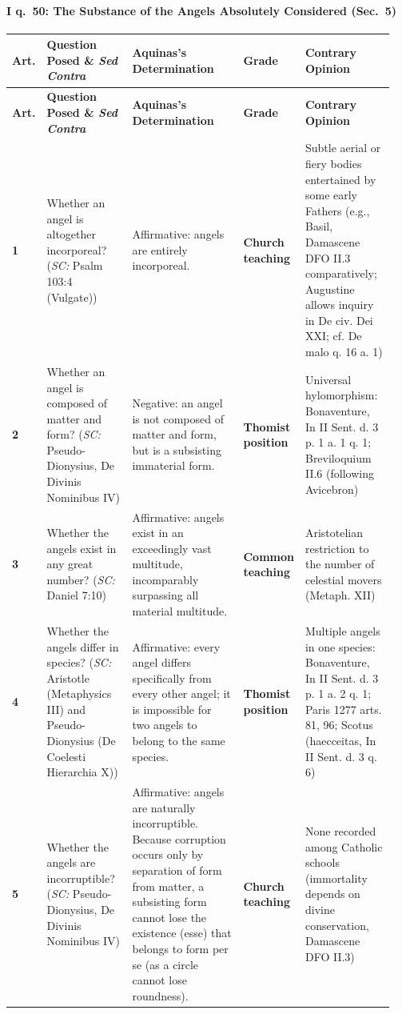 \paragraph{I q.~50: The Substance of the Angels Absolutely Considered (Sec.~5)}
{\scriptsize
\setlength{\tabcolsep}{2.5pt}
\renewcommand{\arraystretch}{1.15}
\begin{longtable}{>{\raggedright\arraybackslash}p{0.05\linewidth}>{\raggedright\arraybackslash}p{0.23\linewidth}>{\raggedright\arraybackslash}p{0.31\linewidth}>{\raggedright\arraybackslash}p{0.12\linewidth}>{\raggedright\arraybackslash}p{0.24\linewidth}}
\toprule
\textbf{Art.} & \textbf{Question Posed \& \emph{Sed Contra}} & \textbf{Aquinas's Determination} & \textbf{Grade} & \textbf{Contrary Opinion} \\
\midrule
\endfirsthead
\toprule
\textbf{Art.} & \textbf{Question Posed \& \emph{Sed Contra}} & \textbf{Aquinas's Determination} & \textbf{Grade} & \textbf{Contrary Opinion} \\
\midrule
\endhead
\bottomrule
\endfoot
\textbf{1} & Whether an angel is altogether incorporeal? (\emph{SC:} Psalm 103:4 (Vulgate)) & Affirmative: angels are entirely incorporeal. & \textbf{Church teaching} & Subtle aerial or fiery bodies entertained by some early Fathers (e.g., Basil, Damascene DFO II.3 comparatively; Augustine allows inquiry in De civ. Dei XXI; cf. De malo q. 16 a. 1) \\
\addlinespace[1.5pt]
\textbf{2} & Whether an angel is composed of matter and form? (\emph{SC:} Pseudo-Dionysius, De Divinis Nominibus IV) & Negative: an angel is not composed of matter and form, but is a subsisting immaterial form. & \textbf{Thomist position} & Universal hylomorphism: Bonaventure, In II Sent. d. 3 p. 1 a. 1 q. 1; Breviloquium II.6 (following Avicebron) \\
\addlinespace[1.5pt]
\textbf{3} & Whether the angels exist in any great number? (\emph{SC:} Daniel 7:10) & Affirmative: angels exist in an exceedingly vast multitude, incomparably surpassing all material multitude. & \textbf{Common teaching} & Aristotelian restriction to the number of celestial movers (Metaph. XII) \\
\addlinespace[1.5pt]
\textbf{4} & Whether the angels differ in species? (\emph{SC:} Aristotle (Metaphysics III) and Pseudo-Dionysius (De Coelesti Hierarchia X)) & Affirmative: every angel differs specifically from every other angel; it is impossible for two angels to belong to the same species. & \textbf{Thomist position} & Multiple angels in one species: Bonaventure, In II Sent. d. 3 p. 1 a. 2 q. 1; Paris 1277 arts. 81, 96; Scotus (haecceitas, In II Sent. d. 3 q. 6) \\
\addlinespace[1.5pt]
\textbf{5} & Whether the angels are incorruptible? (\emph{SC:} Pseudo-Dionysius, De Divinis Nominibus IV) & Affirmative: angels are naturally incorruptible. Because corruption occurs only by separation of form from matter, a subsisting form cannot lose the existence (esse) that belongs to form per se (as a circle cannot lose roundness). & \textbf{Church teaching} & None recorded among Catholic schools (immortality depends on divine conservation, Damascene DFO II.3) \\
\end{longtable}
}

